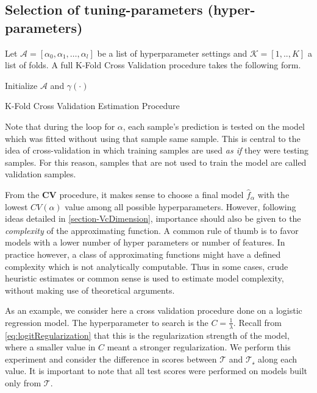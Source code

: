 \subsection{Selection of tuning-parameters (hyper-parameters) }\label{subsection:selection_hyper_params}

 Let $\mathcal{A} = [\alpha_0, \alpha_1,\ldots, \alpha_l  ]$ be a list of hyperparameter settings and $\mathcal{K} =[1,..,K]$ a list of folds. A full K-Fold Cross Validation procedure takes the following form.

 \begin{algorithm}%
 \SetAlgoLined{}
 Initialize $\mathcal{A}$ and $\gamma(\cdot)$\;
 \caption{K-Fold Cross Validation Estimation Procedure}
 \end{algorithm}

Note that during the loop for $\alpha$, each sample's prediction is tested on the model which was fitted without using that sample same sample.
This is central to the idea of cross-validation in which training samples are used \textit{as if} they were testing samples.
For this reason, samples that are not used to train the model are called validation samples.

From the \textbf{CV} procedure, it makes sense to choose a final model $\hat{f}_\alpha$ with the lowest $CV(\alpha)$ value among all possible hyperparameters. However, following ideas detailed in \cref{section-VcDimension}, importance should also be given to the \textit{complexity} of the approximating function. A common rule of thumb is to favor models with a lower number of hyper parameters or number of features. In practice however, a class of approximating functions might have a defined complexity which is not analytically computable. Thus in some cases, crude heuristic estimates or common sense is used to estimate model complexity, without making use of theoretical arguments.


As an example, we consider here a cross validation procedure done on a logistic regression model. The hyperparameter to search is the $C = \frac{1}{\lambda}$. Recall from \cref{eq:logitRegularization} that this is the regularization strength of the model, where a smaller value in $C$ meant a stronger regularization. We perform this experiment and consider the difference in scores between  $\mathcal{T}$ and $\mathcal{T_s}$ along each value. It is important to note that all test scores were performed on models built only from $\mathcal{T}$.


